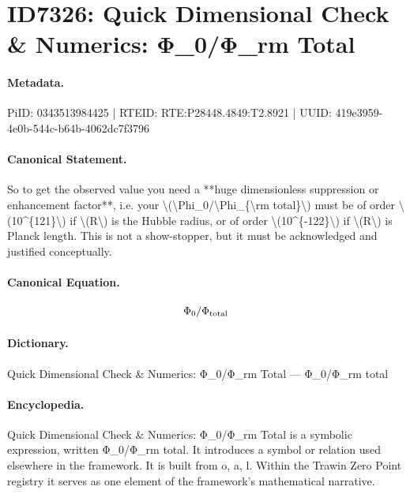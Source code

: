 \section*{ID7326: Quick Dimensional Check \& Numerics: Φ\_0/Φ\_rm Total}
\paragraph{Metadata.}
PiID: 0343513984425 | RTEID: RTE:P28448.4849:T2.8921 | UUID: 419e3959-4e0b-544c-b64b-4062dc7f3796

\paragraph{Canonical Statement.}
So to get the observed value you need a **huge dimensionless suppression or enhancement factor**, i.e. your \textbackslash{}(\textbackslash{}Phi\_0/\textbackslash{}Phi\_\{\textbackslash{}rm total\}\textbackslash{}) must be of order \textbackslash{}(10\textasciicircum{}\{121\}\textbackslash{}) if \textbackslash{}(R\textbackslash{}) is the Hubble radius, or of order \textbackslash{}(10\textasciicircum{}\{-122\}\textbackslash{}) if \textbackslash{}(R\textbackslash{}) is Planck length. This is not a show-stopper, but it must be acknowledged and justified conceptually.

\paragraph{Canonical Equation.}
\[
\Phi_0/\Phi_{\rm total}
\]

\paragraph{Dictionary.}
Quick Dimensional Check \& Numerics: Φ\_0/Φ\_rm Total — Φ\_0/Φ\_rm total

\paragraph{Encyclopedia.}
Quick Dimensional Check \& Numerics: Φ\_0/Φ\_rm Total is a symbolic expression, written Φ\_0/Φ\_rm total. It introduces a symbol or relation used elsewhere in the framework. It is built from o, a, l. Within the Trawin Zero Point registry it serves as one element of the framework's mathematical narrative.

